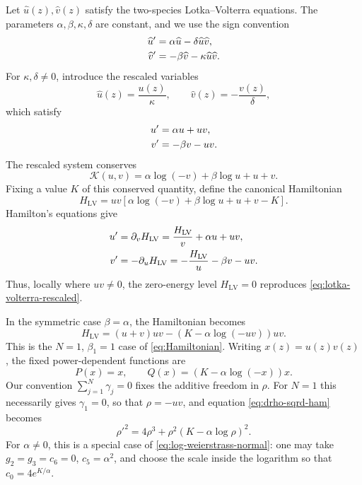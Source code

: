 \documentclass[11pt,a4paper]{article}
\numberwithin{equation}{section}
\begin{document}
Let $\widehat u(z),\widehat v(z)$ satisfy the two-species Lotka--Volterra equations. The parameters $\alpha,\beta,\kappa,\delta$ are constant, and we use the sign convention
\begin{align}
    \widehat{u}' &= \alpha\widehat{u}-\delta\widehat{u}\widehat{v}, \notag \\
    \widehat{v}' &= -\beta\widehat{v}-\kappa\widehat{u}\widehat{v}.
\end{align}
For $\kappa,\delta\ne0$, introduce the rescaled variables
\begin{equation}
    \widehat{u}(z)=\frac{u(z)}{\kappa},
    \qquad
    \widehat{v}(z)=-\frac{v(z)}{\delta},
\end{equation}
which satisfy
\begin{align}
    u' &= \alpha u+uv, \notag \\
    v' &= -\beta v-uv. \label{eq:lotka-volterra-rescaled}
\end{align}
The rescaled system conserves
\begin{equation}
    \mathcal{K}(u,v)
    =
    \alpha\log(-v)+\beta\log u+u+v.
\end{equation}
Fixing a value $K$ of this conserved quantity, define the canonical Hamiltonian
\begin{equation}
    H_{\mathrm{LV}}
    =
    uv\left[
        \alpha\log(-v)+\beta\log u+u+v-K
    \right]. \label{eq:lotka-volterra-hamiltonian}
\end{equation}
Hamilton's equations give
\begin{align}
    u' &= \partial_vH_{\mathrm{LV}}
    =\frac{H_{\mathrm{LV}}}{v}+\alpha u+uv, \notag \\
    v' &= -\partial_uH_{\mathrm{LV}}
    =-\frac{H_{\mathrm{LV}}}{u}-\beta v-uv.
\end{align}
Thus, locally where $uv\ne0$, the zero-energy level $H_{\mathrm{LV}}=0$ reproduces \eqref{eq:lotka-volterra-rescaled}.

In the symmetric case $\beta=\alpha$, the Hamiltonian becomes
\begin{equation}
    H_{\mathrm{LV}}
    =
    (u+v)uv
    -
    \left(K-\alpha\log(-uv)\right)uv.
\end{equation}
This is the $N=1$, $\beta_1=1$ case of \eqref{eq:Hamiltonian}. Writing $x(z)=u(z)v(z)$, the fixed power-dependent functions are
\begin{equation}
    P(x)=x,
    \qquad
    Q(x)=\left(K-\alpha\log(-x)\right)x.
\end{equation}
Our convention $\sum_{j=1}^{N}\gamma_j=0$ fixes the additive freedom in $\rho$. For $N=1$ this necessarily gives $\gamma_1=0$, so that $\rho=-uv$, and equation \eqref{eq:drho-sqrd-ham} becomes
\begin{equation}
    \rho'^2
    =
    4\rho^3
    +
    \rho^2\left(K-\alpha\log\rho\right)^2. \label{eq:rho-lotka-volterra}
\end{equation}
For $\alpha\ne0$, this is a special case of \eqref{eq:log-weierstrass-normal}: one may take $g_2=g_3=c_6=0$, $c_5=\alpha^2$, and choose the scale inside the logarithm so that $c_0=4e^{K/\alpha}$.
\end{document}
